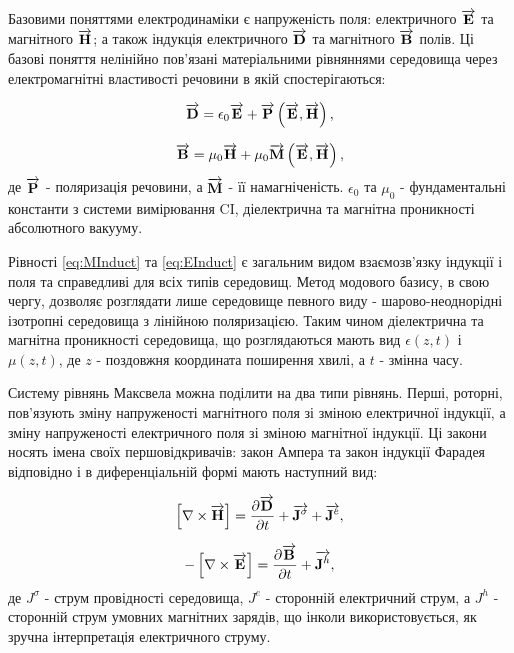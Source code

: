 Базовими поняттями електродинаміки є напруженість поля: електричного 
$ \overrightarrow{\mathbf E} $ та магнітного $ \overrightarrow{\mathbf H} $; а також індукція електричного 
$ \overrightarrow{\mathbf D} $ та магнітного $ \overrightarrow{\mathbf B} $ полів. Ці базові поняття нелінійно 
пов'язані матеріальними рівняннями середовища через електромагнітні 
властивості речовини в якій спостерігаються:

\begin{equation} \label{eq:MInduct}
\overrightarrow{\mathbf D} = \epsilon_0 \overrightarrow{\mathbf E} + \overrightarrow{\mathbf P} \left( \overrightarrow{\mathbf E},\overrightarrow{\mathbf H} \right),
\end{equation}

\begin{equation} \label{eq:EInduct} 
\overrightarrow{\mathbf B} = \mu_0 \overrightarrow{\mathbf H} + \mu_0 \overrightarrow{\mathbf M} \left( \overrightarrow{\mathbf E},\overrightarrow{\mathbf H} \right),
\end{equation}
%
де $ \overrightarrow{\mathbf P} $ - поляризація речовини, а $ \overrightarrow{\mathbf M} $ - її намагніченість.
$ \epsilon_0 $ та $ \mu_0 $ - фундаментальні константи з системи 
вимірювання CI, діелектрична та магнітна проникності абсолютного вакууму.

Рівності \eqref{eq:MInduct} та \eqref{eq:EInduct} є загальним видом 
взаємозв'язку індукції і поля та справедливі для всіх типів середовищ.
Метод модового базису, в свою чергу, дозволяє розглядати лише середовище 
певного виду - шарово-неоднорідні ізотропні середовища з лінійною поляризацією.
Таким чином діелектрична та магнітна проникності середовища, що розглядаються 
мають вид $ \epsilon(z,t) $ і $ \mu(z,t) $, де $ z $ - поздовжня координата 
поширення хвилі, а $ t $ - змінна часу.

Систему рівнянь Максвела можна поділити на два типи рівнянь. Перші, роторні,
пов'язують зміну напруженості магнітного поля зі зміною електричної індукції, 
а зміну напруженості електричного поля зі зміною магнітної індукції. Ці закони 
носять імена своїх першовідкривачів: закон Ампера та закон індукції Фарадея 
відповідно і в диференціальній формі мають наступний вид:

\begin{equation} \label{eq:AmpereLow}
\left[ \nabla \times \overrightarrow{\mathbf H} \right] = 
\frac{\partial \overrightarrow{\mathbf D}}{\partial t} + \overrightarrow{\mathbf J^\sigma} + \overrightarrow{\mathbf J^e},
\end{equation}

\begin{equation} \label{eq:FaradayInduction}
- \left[ \nabla \times \overrightarrow{\mathbf E} \right] =
\frac{\partial \overrightarrow{\mathbf B}}{\partial t} + \overrightarrow{\mathbf J^h},
\end{equation}
%
де $ J^\sigma $ - струм провідності середовища, $ J^e $ - сторонній 
електричний струм, а $ J^h $ - сторонній струм умовних магнітних зарядів, що
інколи використовується, як зручна інтерпретація електричного струму.

